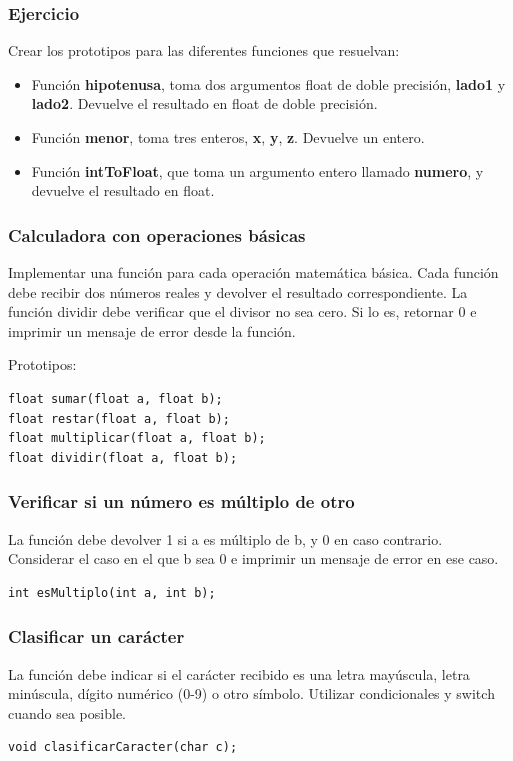\subsubsection{Ejercicio}
Crear los prototipos para las diferentes funciones que resuelvan:
\begin{itemize}
  \item Función \textbf{hipotenusa}, toma dos argumentos float de doble precisión, \textbf{lado1} y \textbf{lado2}. Devuelve el resultado en float de doble precisión.
  \item Función \textbf{menor}, toma tres enteros, \textbf{x}, \textbf{y}, \textbf{z}. Devuelve un entero.
  \item Función \textbf{intToFloat}, que toma un argumento entero llamado \textbf{numero}, y devuelve el resultado en float.
\end{itemize}

\subsubsection{Calculadora con operaciones básicas}
Implementar una función para cada operación matemática básica. Cada función debe recibir dos números reales y devolver el resultado correspondiente. La función dividir debe verificar que el divisor no sea cero. Si lo es, retornar 0 e imprimir un mensaje de error desde la función.

Prototipos:

\begin{lstlisting}[style=customc, basicstyle=\ttfamily]
float sumar(float a, float b);
float restar(float a, float b);
float multiplicar(float a, float b);
float dividir(float a, float b);
\end{lstlisting}


\subsubsection{Verificar si un número es múltiplo de otro}
La función debe devolver 1 si a es múltiplo de b, y 0 en caso contrario. Considerar el caso en el que b sea 0 e imprimir un mensaje de error en ese caso.
\begin{lstlisting}[style=customc, basicstyle=\ttfamily]
int esMultiplo(int a, int b);
\end{lstlisting}

\subsubsection{Clasificar un carácter}
La función debe indicar si el carácter recibido es una letra mayúscula, letra minúscula, dígito numérico (0-9) o otro símbolo. Utilizar condicionales y switch cuando sea posible.
\begin{lstlisting}[style=customc, basicstyle=\ttfamily]
void clasificarCaracter(char c);
\end{lstlisting}

